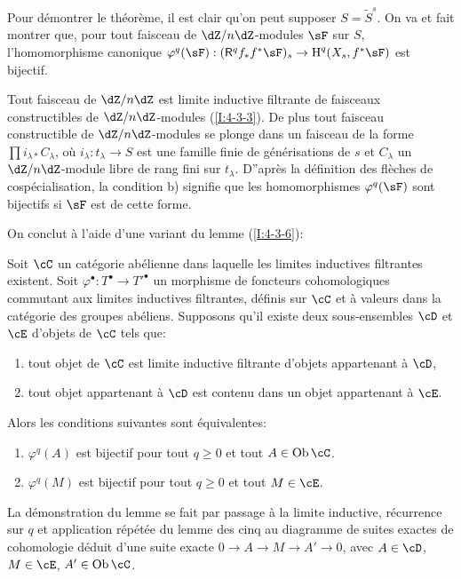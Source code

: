 Pour démontrer le théorème, il est clair qu'on peut supposer 
$S=\widetilde S^s$. On va et fait montrer que, pour tout faisceau de 
$\dZ/n\dZ$-modules $\sF$ sur $S$, l'homomorphisme canonique 
$\varphi^q(\sF):(\R^q f_* f^* \sF)_s \to \h^q(X_s,f^*\sF)$ est bijectif. 

Tout faisceau de $\dZ/n\dZ$ est limite inductive filtrante de faisceaux 
constructibles de $\dZ/n\dZ$-modules (\ref{I:4-3-3}). De plus tout faisceau 
constructible de $\dZ/n\dZ$-modules se plonge dans un faisceau de la forme 
$\prod i_{\lambda *} C_\lambda$, où $i_\lambda:t_\lambda\to S$ est une 
famille finie de générisations de $s$ et $C_\lambda$ un $\dZ/n\dZ$-module 
libre de rang fini sur $t_\lambda$. D''après la définition des flèches de 
cospécialisation, la condition b) signifie que les homomorphismes 
$\varphi^q(\sF)$ sont bijectifs si $\sF$ est de cette forme. 

On conclut à l'aide d'une variant du lemme (\ref{I:4-3-6}):





\begin{lemma}\label{I:5-1-8}
Soit $\cC$ un catégorie abélienne dans laquelle les limites inductives 
filtrantes existent. Soit $\varphi^\bullet:T^\bullet\to{T'}^\bullet$ un 
morphisme de foncteurs cohomologiques commutant aux limites inductives 
filtrantes, définis sur $\cC$ et à valeurs dans la catégorie des groupes 
abéliens. Supposons qu'il existe deux sous-ensembles $\cD$ et $\cE$ d'objets 
de $\cC$ tels que:
\begin{enumerate}[\indent a)]
  \item tout objet de $\cC$ est limite inductive filtrante d'objets appartenant 
    à $\cD$, 
  \item tout objet appartenant à $\cD$ est contenu dans un objet appartenant 
    à $\cE$.
\end{enumerate}

Alors les conditions suivantes sont équivalentes: 
\begin{enumerate}[\indent (i)]
  \item $\varphi^q(A)$ est bijectif pour tout $q\geqslant 0$ et tout 
    $A\in\ob\cC$.
  \item $\varphi^q(M)$ est bijectif pour tout $q\geqslant 0$ et tout $M\in\cE$. 
\end{enumerate}
\end{lemma}

La démonstration du lemme se fait par passage à la limite inductive, 
récurrence sur $q$ et application répétée du lemme des cinq au diagramme 
de suites exactes de cohomologie déduit d'une suite exacte 
$0\to A\to M\to A'\to 0$, avec $A\in\cD$, $M\in\cE$, $A'\in \ob\cC$. 






